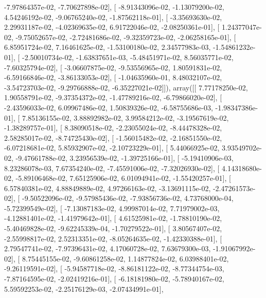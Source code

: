 \documentclass{article}
\begin{document}
         -7.97864357e-02,  -7.70627898e-02],
       [ -8.91343096e-02,  -1.13079200e-02,   4.54246192e-02,
         -9.06765240e-02,  -1.87562118e-01],
       [ -3.35693630e-02,   2.29931187e-02,  -4.02369635e-02,
          6.91722046e-02,  -2.08250361e-01],
       [  1.24377047e-02,  -9.75052657e-02,  -2.72481686e-02,
         -9.32359723e-02,  -2.06258165e-01],
       [  6.85951724e-02,   7.16461625e-02,  -1.53100180e-02,
          2.34577983e-03,  -1.54861232e-01],
       [ -2.50010734e-02,  -1.63837651e-03,  -5.48451971e-02,
          8.56035771e-02,  -7.60325794e-02],
       [ -3.06607875e-02,  -9.53556965e-02,   1.80591831e-02,
         -6.59166846e-02,  -3.86133053e-02],
       [ -1.04635960e-01,   8.48032107e-02,  -3.54723703e-02,
         -9.29766888e-02,  -6.35227021e-02]]), array([[  7.77178250e-02,   1.90558791e-02,  -9.37354372e-02,
         -1.47789216e-02,  -6.79866020e-02],
       [ -2.43596033e-02,   6.09967486e-02,   1.50839326e-02,
         -6.58755686e-03,  -1.98347386e-01],
       [  7.85136155e-02,   3.88892982e-02,   3.99584212e-02,
         -3.19567619e-02,  -1.38289757e-01],
       [  8.38090518e-02,  -2.23055024e-02,  -8.44478328e-02,
          2.58285017e-02,  -8.74725430e-02],
       [ -1.56015482e-02,  -2.16851550e-02,  -6.07218681e-02,
          5.85932907e-02,  -2.10723229e-01],
       [  5.44066925e-02,   3.93549702e-02,  -9.47661788e-02,
          3.23956539e-02,  -1.39725166e-01],
       [ -5.19410906e-03,   8.23286078e-03,   7.67354240e-02,
         -7.45591006e-02,  -7.32026930e-02],
       [  4.14318680e-02,  -5.89106468e-02,   7.65125906e-02,
          6.01094941e-02,  -1.55420257e-01],
       [  6.57840381e-02,   4.88849889e-02,   4.97266163e-02,
         -3.13691115e-02,  -2.47261573e-02],
       [ -9.50522096e-02,  -9.57985436e-02,  -7.93856736e-02,
          4.73768000e-04,  -5.72399549e-02],
       [ -7.13087183e-02,   4.99987014e-02,   7.71979002e-03,
         -4.12881401e-02,  -1.41979642e-01],
       [  4.61525981e-02,  -1.78810190e-02,  -5.40469828e-02,
         -9.62245339e-04,  -1.70279522e-01],
       [  3.80567407e-02,  -2.55998817e-02,   2.52313351e-02,
         -8.05264635e-02,  -1.42330388e-01],
       [  2.79547741e-02,  -7.97396431e-02,   4.17060728e-02,
          7.63679300e-03,  -1.91067992e-02],
       [  8.75445155e-02,  -9.60861258e-02,   1.14877824e-02,
          6.03988401e-02,  -9.26119591e-02],
       [ -5.94587718e-02,  -8.86181122e-02,  -8.77344754e-03,
         -7.87164595e-02,  -2.02419216e-01],
       [ -6.18181980e-02,  -5.78940167e-02,   5.59592253e-02,
         -2.25176129e-03,  -2.07434991e-01],
\end{document}
